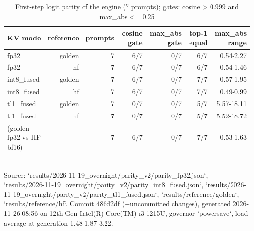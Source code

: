 \begin{table}[t]\centering\small
\caption{First-step logit parity of the engine (7 prompts); gates: cosine > 0.999 and max\_abs <= 0.25}
\begin{tabular}{lrrrrrr}\toprule
KV mode & reference & prompts & cosine gate & max\_abs gate & top-1 equal & max\_abs range \\ \midrule
fp32 & golden & 7 & 6/7 & 0/7 & 6/7 & 0.54-2.27 \\
fp32 & hf & 7 & 6/7 & 0/7 & 6/7 & 0.54-1.46 \\
int8\_fused & golden & 7 & 6/7 & 0/7 & 7/7 & 0.57-1.95 \\
int8\_fused & hf & 7 & 6/7 & 0/7 & 7/7 & 0.49-0.99 \\
tl1\_fused & golden & 7 & 0/7 & 0/7 & 5/7 & 5.57-18.11 \\
tl1\_fused & hf & 7 & 0/7 & 0/7 & 5/7 & 5.52-18.72 \\
(golden fp32 vs HF bf16) & - & 7 & 6/7 & 0/7 & 7/7 & 0.53-1.63 \\
\bottomrule\end{tabular}
\\[2pt]{\scriptsize Source: `results/2026-11-19\_overnight/parity\_v2/parity\_fp32.json`, `results/2026-11-19\_overnight/parity\_v2/parity\_int8\_fused.json`, `results/2026-11-19\_overnight/parity\_v2/parity\_tl1\_fused.json`, `results/reference/golden`, `results/reference/hf`. Commit 486d2df (+uncommitted changes), generated 2026-11-26 08:56 on 12th Gen Intel(R) Core(TM) i3-1215U, governor `powersave`, load average at generation 1.48 1.87 3.22.}
\end{table}

